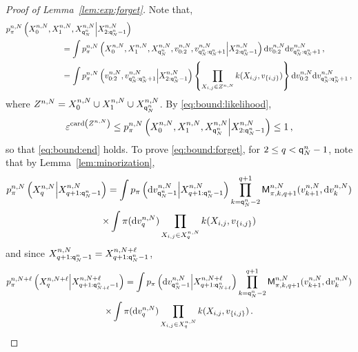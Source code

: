 \begin{proof}[Proof of Lemma~\ref{lem:exp:forget}]
Note that,
\begin{align*}
p_{\pi}^{n,N}\left(X_{0}^{n,N},X_{1}^{n,N},X_{\ordermax{n}{N}}^{n,N}\middle|X_{2:\ordermax{n}{N}-1}^{n,N}\right) &\\
&\hspace{-3cm}= \int p_{\pi}^{n,N}\left(X_{0}^{n,N},X_{1}^{n,N},X_{\ordermax{n}{N}}^{n,N},v_{0:2}^{n,N},v_{\ordermax{n}{N}:\ordermax{n}{N}+1}^{n,N}\middle|X_{2:\ordermax{n}{N}-1}^{n,N}\right)\rmd v_{0:2}^{n,N}\rmd v_{\ordermax{n}{N}:\ordermax{n}{N}+1}^{n,N}\eqsp,\\
&\hspace{-3cm}= \int p_{\pi}^{n,N}\left(v_{0:2}^{n,N},v_{\ordermax{n}{N}:\ordermax{n}{N}+1}^{n,N}\middle|X_{2:\ordermax{n}{N}-1}^{n,N}\right)\left\{\prod_{X_{i,j}\in Z^{n,N}}\condlik(X_{i,j},v_{\{i,j\}})\right\}\rmd v_{0:2}^{n,N}\rmd v_{\ordermax{n}{N}:\ordermax{n}{N}+1}^{n,N}\eqsp,
\end{align*}
where $Z^{n,N} = X_{0}^{n,N}\cup X_{1}^{n,N}\cup X_{{\mathsf{q}}^{n}_{N}}^{n,N}$.
By \eqref{eq:bound:likelihood},
\[
\varepsilon^{\mathrm{card}\left(Z^{n,N}\right)}\le p_{\pi}^{n,N}\left(X_{0}^{n,N},X_{1}^{n,N},X_{{\mathsf{q}}^{n}_{N}}^{n,N}\middle|X_{2:{\mathsf{q}}^{n}_{N}-1}^{n,N}\right)  \le 1\,,
\]
so that \eqref{eq:bound:end} holds. To prove \eqref{eq:bound:forget}, for $2\le q< {\mathsf{q}}^{n}_{N}-1$, note that by Lemma~\ref{lem:minorization},  
\begin{multline}
\label{eq:decomp:prod:kernel}
p_{\pi}^{n,N}\left(X^{n,N}_{q}\middle|X^{n,N}_{q+1:{\mathsf{q}}^{n}_{N}-1}\right) = \int p_{\pi}\left(\mathrm{d} v_{{\mathsf{q}}^{n}_{N}-1}^{n,N}\middle | X^{n,N}_{q+1:{\mathsf{q}}^{n}_{N}-1}\right) \prod_{k ={\mathsf{q}}^{n}_{N}-2}^{q+1}\mathsf{M}^{n,N}_{\pi,k,q+1}(v_{k+1}^{n,N},\mathrm{d} v_k^{n,N})\\
\times\int \pi(\mathrm{d} v_q^{n,N})\prod_{X_{i,j}\in X_{q}^{n,N}}k(X_{i,j},v_{\{i,j\}})
\end{multline}
and since $X^{n,N}_{q+1:{\mathsf{q}}^{n}_{N}-1}=X^{n,N+\ell}_{q+1:{\mathsf{q}}^{n}_{N}-1}$,
\begin{multline}
\label{eq:decomp:prod:kernel:plus}
p_{\pi}^{n,N+\ell}\left(X^{n,N+\ell}_{q}\middle|X^{n,N+\ell}_{q+1:\ordermax{n}{N+\ell}-1}\right) = \int p_{\pi}\left(\rmd v_{\ordermax{n}{N}-1}^{n,N}\middle | X^{n,N+\ell}_{q+1:\ordermax{n}{N+\ell}}\right) \prod_{k =\ordermax{n}{N}-2}^{q+1}\kernel^{n,N}_{\pi,k,q+1}(v_{k+1}^{n,N},\rmd v_k^{n,N})\\
\times\int \pi(\rmd v_q^{n,N})\prod_{X_{i,j}\in X_{q}^{n,N}}\condlik(X_{i,j},v_{\{i,j\}})\eqsp.

\end{multline}
\end{proof}
